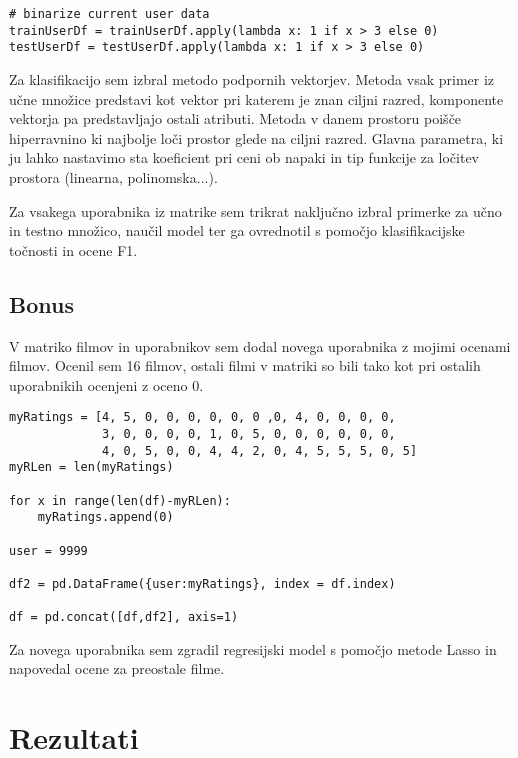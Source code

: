 \documentclass[a4paper,11pt]{article}
\begin{document}
\begin{lstlisting}
# binarize current user data
trainUserDf = trainUserDf.apply(lambda x: 1 if x > 3 else 0)
testUserDf = testUserDf.apply(lambda x: 1 if x > 3 else 0)
\end{lstlisting}

Za klasifikacijo sem izbral metodo podpornih vektorjev. Metoda vsak primer iz učne množice predstavi
kot vektor pri katerem je znan ciljni razred, komponente vektorja pa predstavljajo ostali atributi. 
Metoda v danem prostoru poišče hiperravnino ki najbolje loči prostor glede na ciljni razred. Glavna
parametra, ki ju lahko nastavimo sta koeficient pri ceni ob napaki in tip funkcije za ločitev prostora 
(linearna, polinomska...).

Za vsakega uporabnika iz matrike sem trikrat naključno izbral primerke za učno in testno množico, 
naučil model ter ga ovrednotil s pomočjo klasifikacijske točnosti in ocene F1.

\subsection{Bonus}
V matriko filmov in uporabnikov sem dodal novega uporabnika z mojimi ocenami filmov. Ocenil sem 16 filmov, ostali filmi v matriki so bili tako kot pri ostalih uporabnikih ocenjeni z oceno 0. 

\begin{lstlisting}
myRatings = [4, 5, 0, 0, 0, 0, 0, 0 ,0, 4, 0, 0, 0, 0, 
             3, 0, 0, 0, 0, 1, 0, 5, 0, 0, 0, 0, 0, 0, 
             4, 0, 5, 0, 0, 4, 4, 2, 0, 4, 5, 5, 5, 0, 5]
myRLen = len(myRatings)

for x in range(len(df)-myRLen):
    myRatings.append(0)

user = 9999

df2 = pd.DataFrame({user:myRatings}, index = df.index)

df = pd.concat([df,df2], axis=1)
\end{lstlisting}

Za novega uporabnika sem zgradil regresijski model s pomočjo metode Lasso in napovedal ocene za preostale filme.

\section{Rezultati}

\end{document}
